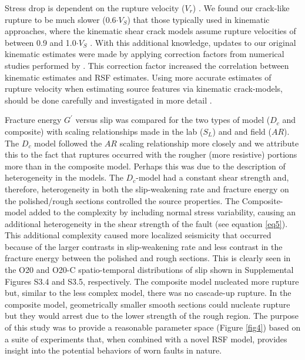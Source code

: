 \documentclass[preprint,1p, 10pt,authoryear]{elsarticle}
\begin{document}
Stress drop is dependent on the rupture velocity ($V_{r}$) \citep{Kaneko2015}. We found our crack-like rupture to be much slower (0.6$\cdot V_{S}$) that those typically used in kinematic approaches, where the kinematic shear crack models assume rupture velocities of between 0.9 and 1.0$\cdot V_{S}$ \citep{Cocco2016, Selvadurai2019}. With this additional knowledge, updates to our original kinematic estimates were made by applying correction factors from numerical studies performed by \citet{Kaneko2015}. This correction factor increased the correlation between kinematic estimates and RSF estimates. Using more accurate estimates of rupture velocity when estimating source features via kinematic crack-models, should be done carefully and investigated in more detail \citep{McGuire2018}.

Fracture energy $G^{'}$ versus slip was compared for the two types of model ($D_{c}$ and composite) with scaling relationships made in the lab ($S_{L}$) and and field ($AR$). The $D_{c}$ model followed the $AR$ scaling relationship more closely and we attribute this to the fact that ruptures occurred with the rougher (more resistive) portions more than in the composite model.  Perhaps this was due to the description of heterogeneity in the models. The $D_{c}$-model had a constant shear strength and, therefore, heterogeneity in both the slip-weakening rate and fracture energy on the polished/rough sections controlled the source properties. The Composite-model added to the complexity by including normal stress variability, causing an additional heterogeneity in the shear strength of the fault (see equation \eqref{eq5}). This additional complexity caused more localized seismicity that occurred because of the larger contrasts in slip-weakening rate and less contrast in the fracture energy between the polished and rough sections. This is clearly seen in the O20 and O20-C spatio-temporal distributions of slip shown in Supplemental Figures S3.4 and S3.5, respectively.  The composite model nucleated more rupture but, similar to the less complex model, there was no cascade-up rupture.  In the composite model, geometrically smaller smooth sections could nucleate rupture but they would arrest due to the lower strength of the rough region. The purpose of this study was to provide a reasonable parameter space (Figure \ref{fig4}) based on a suite of experiments that, when combined with a novel RSF model, provides insight into the potential behaviors of worn faults in nature.
\end{document}
